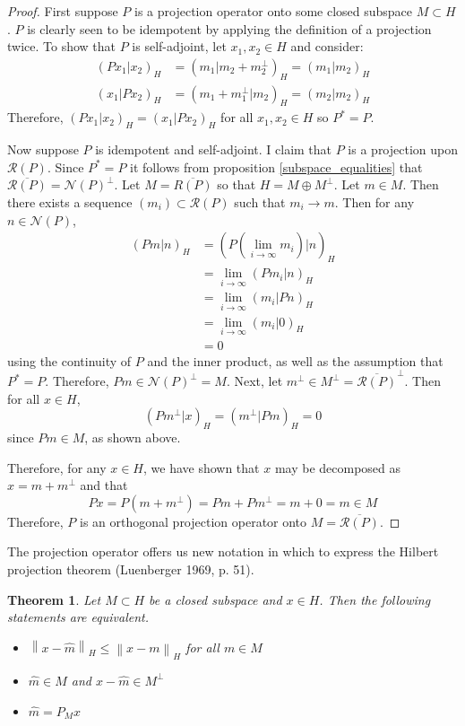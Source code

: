 \documentclass[12pt]{article}
\newcommand*{\norm}[1]{\left\lVert#1\right\rVert}
\newcommand{\R}{\mathcal{R}}
\newcommand{\N}{\mathcal{N}}
\newtheorem{thm}{Theorem}
\begin{document}
\begin{proof} 
First suppose $P$ is a projection operator onto some closed subspace $M \subset H$. $P$ is clearly seen 
to be idempotent by applying the definition of a projection twice. To show that $P$ is self-adjoint, let $x_1, x_2 \in H$
and consider: 
\begin{align*} 
(Px_1|x_2)_H &= (m_1|m_2 + m_2^\perp)_H = (m_1|m_2)_H \\
(x_1|Px_2)_H &= (m_1 + m_1^\perp|m_2)_H = (m_2|m_2)_H
\end{align*} 
Therefore, $(Px_1|x_2)_H = (x_1|Px_2)_H$ for all $x_1, x_2 \in H$ so $P^* = P$. 

Now suppose $P$ is idempotent and self-adjoint. I claim that $P$ is a projection
upon $\R(P)$. Since $P^* = P$ it follows from proposition \eqref{subspace_equalities}
that $\overline{\R(P)} = \N(P)^\perp$. Let $M = \overline{R(P)}$ so that $H = M \oplus M^\perp$. 
Let $m \in M$. Then there exists a sequence $(m_i) \subset \R(P)$ such that $m_i \to m$. Then for any $n \in \N(P)$,
\begin{align*} 
(Pm|n)_H &= (P(\lim_{i \to \infty} m_i)|n)_H \\
            &= \lim_{i \to \infty} (Pm_i|n)_H \\
            &= \lim_{i \to \infty} (m_i|Pn)_H \\
            &= \lim_{i \to \infty} (m_i|0)_H \\
            &= 0
\end{align*} 
using the continuity of $P$ and the inner product, as well as the assumption that $P^* = P$. 
Therefore, $Pm \in \N(P)^\perp = M$. 
Next, let $m^\perp \in M^\perp = \overline{\R(P)}^\perp$. Then for all $x \in H$, 
\[(Pm^\perp|x)_H = (m^\perp|Pm)_H = 0\]
since $Pm \in M$, as shown above. 

Therefore, for any $x \in H$, we have shown that $x$ may be decomposed as $x = m + m^\perp$
and that \[Px = P(m + m^\perp) = Pm + Pm^\perp = m + 0 = m \in M\]
Therefore, $P$ is an orthogonal projection operator onto $M = \overline{\R(P)}$. 
\end{proof} 

The projection operator offers us new notation in which to express the Hilbert projection theorem (Luenberger 1969, p. 51). 
\begin{thm} \label{projection_theorem}
Let $M \subset H$ be a closed subspace and $x \in H$. Then the following statements are equivalent. 
\begin{itemize} 
\item $\norm{x - \hat{m}}_H \leq \norm{x - m}_H$ for all $m \in M$ 
\item $\hat{m} \in M$ and $x - \hat{m} \in M^\perp$
\item $\hat{m} = P_M x$
\end{itemize} 
\end{thm} 
\end{document}
